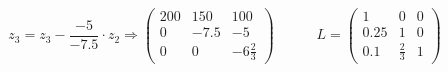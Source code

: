 \[ z_3 = z_3 - \frac{-5}{-7.5} \cdot z_2 \Rightarrow \left( \begin{array}{ccc}
200 & 150 & 100\\
0 & -7.5 & -5\\
0 & 0 & -6\frac{2}{3} \end{array}\right) \quad \quad \quad L= \left( \begin{array}{ccc}
1 & 0 & 0\\
0.25 & 1 & 0\\
0.1 & \frac{2}{3} & 1\end{array} \right) \]
